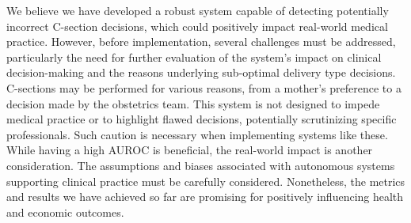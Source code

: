 
We believe we have developed a robust system capable of detecting potentially incorrect C-section decisions, which could positively impact real-world medical practice. However, before implementation, several challenges must be addressed, particularly the need for further evaluation of the system's impact on clinical decision-making and the reasons underlying sub-optimal delivery type decisions. C-sections may be performed for various reasons, from a mother's preference to a decision made by the obstetrics team. This system is not designed to impede medical practice or to highlight flawed decisions, potentially scrutinizing specific professionals. Such caution is necessary when implementing systems like these. While having a high AUROC is beneficial, the real-world impact is another consideration. The assumptions and biases associated with autonomous systems supporting clinical practice must be carefully considered. Nonetheless, the metrics and results we have achieved so far are promising for positively influencing health and economic outcomes.